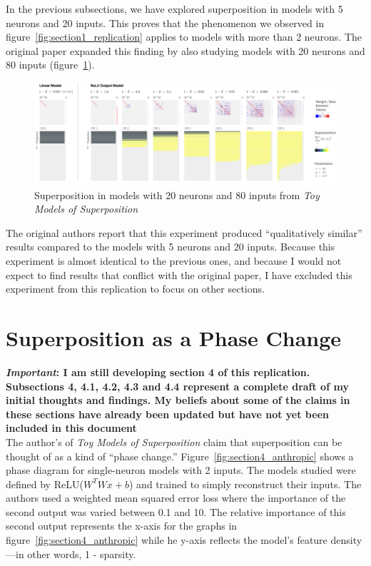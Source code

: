 \documentclass{article} %
\begin{document}
In the previous subsections, we have explored superposition in models with 5
neurons and 20 inputs. This proves that the phenomenon we observed in figure~\ref{fig:section1_replication}
applies to models with more than 2 neurons. The original paper expanded this 
finding by also studying models with 20 neurons and 80 inputs (figure~\ref{fig:section3_anthropic2}). \\

\begin{figure}[h]
    \centering
    \includegraphics[width=0.99\linewidth]{demonstrating_superposition/images/anthropic_section3_part2.png}
    \captionsetup{font=footnotesize, width=0.7\linewidth} %
    \caption{
        Superposition in models with 20 neurons and 80 inputs from \textit{Toy Models of Superposition}\cite{elhage2022toy}
    }
    \label{fig:section3_anthropic2}
\end{figure}

The original authors report that this experiment produced ``qualitatively similar''
results compared to the models with 5 neurons and 20 inputs. Because this experiment 
is almost identical to the previous ones, and because I would not expect to find 
results that conflict with the original paper, I have excluded this experiment 
from this replication to focus on other sections. \\

\section{Superposition as a Phase Change}

\textbf{\textit{Important}: I am still developing section 4 of this replication. 
Subsections 4, 4.1, 4.2, 4.3 and 4.4 represent a complete draft of my initial 
thoughts and findings. My beliefs about some of the claims in these sections
have already been updated but have not yet been included in this document} \\

The author's of \textit{Toy Models of Superposition} claim that superposition
can be thought of as a kind of ``phase change.'' Figure~\ref{fig:section4_anthropic}
shows a phase diagram for single-neuron models with 2 inputs. The models studied were
defined by ReLU($W^TWx + b$) and trained to simply reconstruct their inputs. The authors 
used a weighted mean squared error loss where the importance of 
the second output was varied between 0.1 and 10. The relative importance of this
second output represents the x-axis for the graphs in figure~\ref{fig:section4_anthropic}
while he y-axis reflects the model's feature density---in other words, 1 - sparsity.
\end{document}

